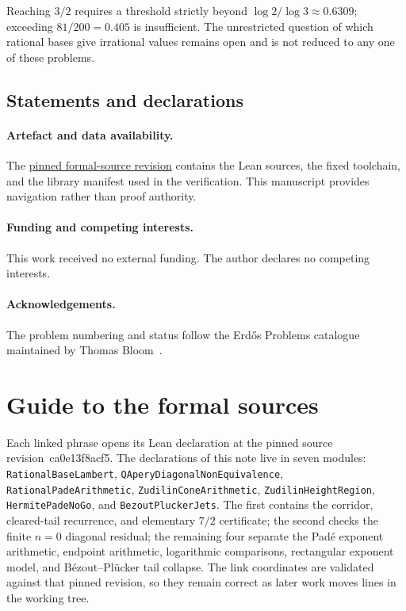 \documentclass[11pt]{article}
\renewcommand{\commitshort}{ca0e13f8acf5}
\begin{document}
Reaching $3/2$ requires a threshold strictly beyond
$\log2/\log3\approx0.6309$; exceeding $81/200=0.405$ is insufficient.
The unrestricted question of which rational bases give irrational values
remains open and is not reduced to any one of these problems.

\subsection*{Statements and declarations}

\paragraph{Artefact and data availability.} The
\href{\sourceurl}{pinned formal-source revision} contains the Lean sources, the
fixed toolchain, and the library manifest used in the verification.  This
manuscript provides navigation rather than proof authority.

\paragraph{Funding and competing interests.} This work received no external
funding.  The author declares no competing interests.

\paragraph{Acknowledgements.} The problem numbering and status follow the
Erd\H{o}s Problems catalogue maintained by Thomas Bloom~\cite{erdosproblems}.

\appendix
\section{Guide to the formal sources}\label{app:index}

Each linked phrase opens its Lean declaration at the pinned source
revision~\commitshort.  The declarations of this note live in seven modules:
\texttt{RationalBaseLambert}, \texttt{QAperyDiagonalNonEquivalence},
\texttt{RationalPadeArithmetic}, \texttt{ZudilinConeArithmetic},
\texttt{ZudilinHeightRegion}, \texttt{HermitePadeNoGo}, and
\texttt{BezoutPluckerJets}.  The first contains
the corridor, cleared-tail recurrence, and elementary $7/2$ certificate; the
second checks the finite $n=0$ diagonal residual; the remaining four separate
the Pad\'e exponent arithmetic, endpoint arithmetic, logarithmic comparisons,
rectangular exponent model, and B\'ezout--Pl\"ucker tail collapse.  The link
coordinates are validated against that pinned revision, so they remain correct
as later work moves lines in the working tree.
\end{document}
